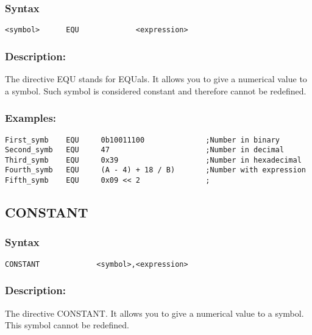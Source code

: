         \subsubsection{Syntax}
            {
                \usecodefont
                \verb'<symbol>      EQU             <expression> '
            }

        \subsubsection{Description:}
            The directive EQU stands for EQUals. It allows you to give a numerical value to a symbol. Such symbol is considered constant and therefore cannot be redefined.

        \subsubsection{Examples:}
            {
                \usecodefont
                \verb'First_symb    EQU     0b10011100              ;Number in binary'\\
                \verb'Second_symb   EQU     47                      ;Number in decimal'\\
                \verb'Third_symb    EQU     0x39                    ;Number in hexadecimal'\\
                \verb'Fourth_symb   EQU     (A - 4) + 18 / B)       ;Number with expression'\\
                \verb'Fifth_symb    EQU     0x09 << 2               ;'\\
            }

    \subsection{CONSTANT}
        \subsubsection{Syntax}
            {
                \usecodefont
                \verb'CONSTANT             <symbol>,<expression>'
            }

        \subsubsection{Description:}
            The directive CONSTANT. It allows you to give a numerical value to a symbol. This symbol cannot be redefined.

